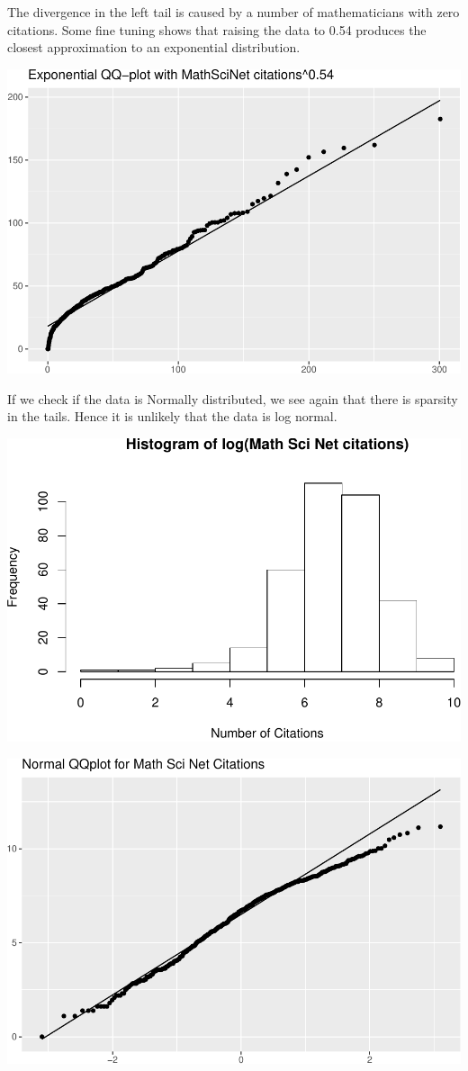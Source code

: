 \documentclass[]{article}
\begin{document}
The divergence in the left tail is caused by a number of mathematicians
with zero citations. Some fine tuning shows that raising the data to
0.54 produces the closest approximation to an exponential distribution.

\includegraphics{final_files/figure-latex/unnamed-chunk-15-1.pdf}

If we check if the data is Normally distributed, we see again that there
is sparsity in the tails. Hence it is unlikely that the data is log
normal.

\includegraphics{final_files/figure-latex/unnamed-chunk-16-1.pdf}

\includegraphics{final_files/figure-latex/unnamed-chunk-17-1.pdf}
\end{document}
